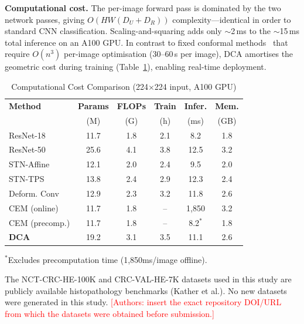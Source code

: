 \documentclass[pdflatex,sn-nature]{sn-jnl}%
\theoremstyle{thmstyleone}%
\theoremstyle{thmstyletwo}%
\theoremstyle{thmstylethree}%
\begin{document}
\textbf{Computational cost.} The per-image forward pass is dominated by the two
network passes, giving $O(HW(D_U+D_R))$ complexity---identical in order to
standard CNN classification. Scaling-and-squaring adds only $\sim$2\,ms to the
$\sim$15\,ms total inference on an A100 GPU. In contrast to fixed conformal
methods~\cite{huang2024surface} that require $O(n^3)$ per-image optimisation
(30--60\,s per image), DCA amortises the geometric cost during training
(Table~\ref{tab:computational}), enabling real-time deployment.

\begin{table}[t]
\centering
\caption{Computational Cost Comparison (224$\times$224 input, A100 GPU)}
\label{tab:computational}
\begin{tabularx}{\textwidth}{Xccccc}
\hline
\textbf{Method} & \textbf{Params} & \textbf{FLOPs} & \textbf{Train} & \textbf{Infer.} & \textbf{Mem.} \\
 & (M) & (G) & (h) & (ms) & (GB) \\
\hline
ResNet-18 & 11.7 & 1.8 & 2.1 & 8.2 & 1.8 \\
ResNet-50 & 25.6 & 4.1 & 3.8 & 12.5 & 3.2 \\
STN-Affine & 12.1 & 2.0 & 2.4 & 9.5 & 2.0 \\
STN-TPS & 13.8 & 2.4 & 2.9 & 12.3 & 2.4 \\
Deform. Conv & 12.9 & 2.3 & 3.2 & 11.8 & 2.6 \\
CEM (online) & 11.7 & 1.8 & -- & 1,850 & 3.2 \\
CEM (precomp.) & 11.7 & 1.8 & -- & 8.2$^*$ & 1.8 \\
\textbf{DCA} & 19.2 & 3.1 & 3.5 & 11.1 & 2.6 \\
\hline
\end{tabularx}

\vspace{1mm}
\footnotesize{$^*$Excludes precomputation time (1,850ms/image offline).}
\end{table}
\backmatter

The NCT-CRC-HE-100K and CRC-VAL-HE-7K datasets used in this study are publicly available histopathology benchmarks (Kather et al.). No new datasets were generated in this study. \textcolor{red}{[Authors: insert the exact repository DOI/URL from which the datasets were obtained before submission.]}
\end{document}
